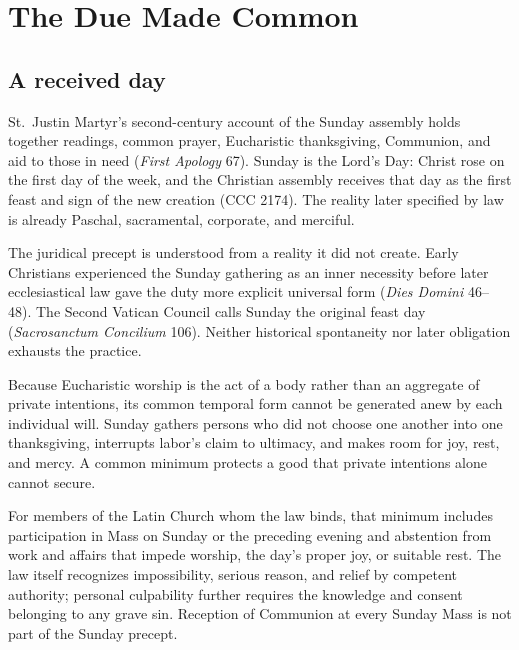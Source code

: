 \section{The Due Made Common}

\subsection{A received day}

St.~Justin Martyr's second-century account of the Sunday assembly holds together readings, common prayer, Eucharistic thanksgiving, Communion, and aid to those in need (\emph{First Apology} 67). Sunday is the Lord's Day: Christ rose on the first day of the week, and the Christian assembly receives that day as the first feast and sign of the new creation (CCC 2174). The reality later specified by law is already Paschal, sacramental, corporate, and merciful.

The juridical precept is understood from a reality it did not create. Early Christians experienced the Sunday gathering as an inner necessity before later ecclesiastical law gave the duty more explicit universal form (\emph{Dies Domini} 46--48). The Second Vatican Council calls Sunday the original feast day (\emph{Sacrosanctum Concilium} 106). Neither historical spontaneity nor later obligation exhausts the practice.

Because Eucharistic worship is the act of a body rather than an aggregate of private intentions, its common temporal form cannot be generated anew by each individual will. Sunday gathers persons who did not choose one another into one thanksgiving, interrupts labor's claim to ultimacy, and makes room for joy, rest, and mercy. A common minimum protects a good that private intentions alone cannot secure.

For members of the Latin Church whom the law binds, that minimum includes participation in Mass on Sunday or the preceding evening and abstention from work and affairs that impede worship, the day's proper joy, or suitable rest. The law itself recognizes impossibility, serious reason, and relief by competent authority; personal culpability further requires the knowledge and consent belonging to any grave sin. Reception of Communion at every Sunday Mass is not part of the Sunday precept.

